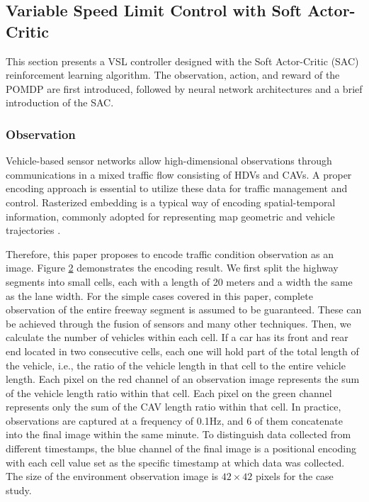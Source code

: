 \documentclass[11pt, letterpaper]{article}
\begin{document}
\subsection{Variable Speed Limit Control with Soft Actor-Critic}

This section presents a VSL controller designed with the Soft Actor-Critic (SAC) reinforcement learning algorithm. The observation, action, and reward of the POMDP are first introduced, followed by neural network architectures and a brief introduction of the SAC.

\subsubsection{Observation}

Vehicle-based sensor networks allow high-dimensional observations through communications in a mixed traffic flow consisting of HDVs and CAVs. A proper encoding approach is essential to utilize these data for traffic management and control. Rasterized embedding is a typical way of encoding spatial-temporal information, commonly adopted for representing map geometric and vehicle trajectories \citep{https://doi.org/10.48550/arxiv.2006.14480}.

Therefore, this paper proposes to encode traffic condition observation as an image. Figure \hyperref[fig:2]{2} demonstrates the encoding result. We first split the highway segments into small cells, each with a length of 20 meters and a width the same as the lane width. For the simple cases covered in this paper, complete observation of the entire freeway segment is assumed to be guaranteed. These can be achieved through the fusion of sensors and many other techniques. Then, we calculate the number of vehicles within each cell. If a car has its front and rear end located in two consecutive cells, each one will hold part of the total length of the vehicle, i.e., the ratio of the vehicle length in that cell to the entire vehicle length. Each pixel on the red channel of an observation image represents the sum of the vehicle length ratio within that cell. Each pixel on the green channel represents only the sum of the CAV length ratio within that cell. In practice, observations are captured at a frequency of 0.1Hz, and 6 of them concatenate into the final image within the same minute. To distinguish data collected from different timestamps, the blue channel of the final image is a positional encoding with each cell value set as the specific timestamp at which data was collected. The size of the environment observation image is $42\times 42$ pixels for the case study.
\end{document}
